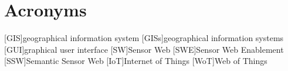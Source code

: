 
\chapter*{Acronyms}

\begin{acronym}[UML]
  [GIS]{geographical information system}
  [GISs]{geographical information systems}
  [GUI]{graphical user interface}
  [SW]{Sensor Web}
  [SWE]{Sensor Web Enablement}
  [SSW]{Semantic Sensor Web}
  [IoT]{Internet of Things}
  [WoT]{Web of Things}
\end{acronym}